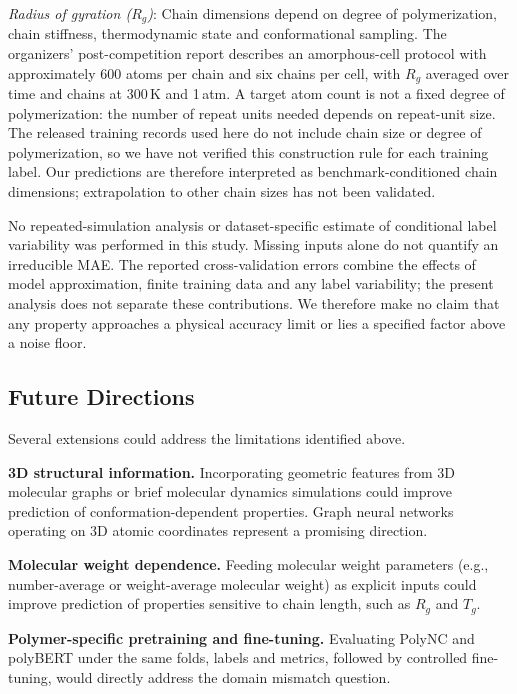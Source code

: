 \documentclass{article}
\begin{document}
\emph{Radius of gyration ($R_g$)}: Chain dimensions depend on degree of polymerization, chain stiffness, thermodynamic state and conformational sampling. The organizers' post-competition report describes an amorphous-cell protocol with approximately 600 atoms per chain and six chains per cell, with $R_g$ averaged over time and chains at 300\,K and 1\,atm.\cite{liu_open_polymer_report_2025} A target atom count is not a fixed degree of polymerization: the number of repeat units needed depends on repeat-unit size. The released training records used here do not include chain size or degree of polymerization, so we have not verified this construction rule for each training label. Our predictions are therefore interpreted as benchmark-conditioned chain dimensions; extrapolation to other chain sizes has not been validated.

No repeated-simulation analysis or dataset-specific estimate of conditional label variability was performed in this study. Missing inputs alone do not quantify an irreducible MAE. The reported cross-validation errors combine the effects of model approximation, finite training data and any label variability; the present analysis does not separate these contributions. We therefore make no claim that any property approaches a physical accuracy limit or lies a specified factor above a noise floor.

\subsection{Future Directions}

Several extensions could address the limitations identified above.

\textbf{3D structural information.} Incorporating geometric features from 3D molecular graphs or brief molecular dynamics simulations could improve prediction of conformation-dependent properties. Graph neural networks operating on 3D atomic coordinates represent a promising direction.

\textbf{Molecular weight dependence.} Feeding molecular weight parameters (e.g., number-average or weight-average molecular weight) as explicit inputs could improve prediction of properties sensitive to chain length, such as $R_g$ and $T_g$.

\textbf{Polymer-specific pretraining and fine-tuning.} Evaluating PolyNC and polyBERT under the same folds, labels and metrics, followed by controlled fine-tuning, would directly address the domain mismatch question.
\end{document}

